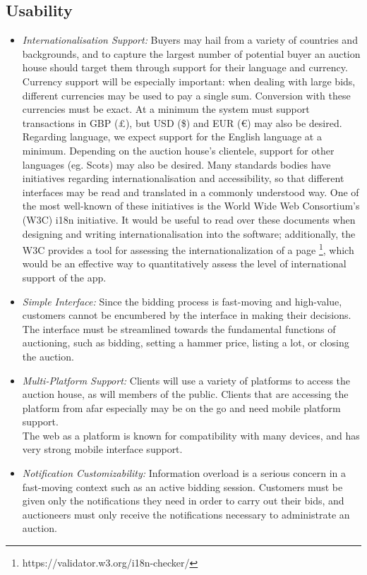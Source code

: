 \documentclass[titlepage, 12pt]{extarticle}
\begin{document}
\subsection{Usability}
\begin{itemize}
\item {\it Internationalisation Support:} Buyers may hail from a variety of countries and backgrounds, and to capture the largest number of potential buyer an auction house should target them through support for their language and currency. Currency support will be especially important: when dealing with large bids, different currencies may be used to pay a single sum. Conversion with these currencies must be exact. At a minimum the system must support transactions in GBP (\pounds), but USD (\$) and EUR (\euro) may also be desired.
\\Regarding language, we expect support for the English language at a minimum. Depending on the auction house's clientele, support for other languages (eg. Scots) may also be desired. Many standards bodies have initiatives regarding internationalisation and accessibility, so that different interfaces may be read and translated in a commonly understood way. One of the most well-known of these initiatives is the World Wide Web Consortium's (W3C) i18n initiative. It would be useful to read over these documents when designing and writing internationalisation into the software; additionally, the W3C provides a tool for assessing the internationalization of a page \footnote{https://validator.w3.org/i18n-checker/}, which would be an effective way to quantitatively assess the level of international support of the app.
\item {\it Simple Interface:} Since the bidding process is fast-moving and high-value, customers cannot be encumbered by the interface in making their decisions. The interface must be streamlined towards the fundamental functions of auctioning, such as bidding, setting a hammer price, listing a lot, or closing the auction.
\item {\it Multi-Platform Support:} Clients will use a variety of platforms to access the auction house, as will members of the public. Clients that are accessing the platform from afar especially may be on the go and need mobile platform support.
\\The web as a platform is known for compatibility with many devices, and has very strong mobile interface support.
\item {\it Notification Customizability:} Information overload is a serious concern in a fast-moving context such as an active bidding session. Customers must be given only the notifications they need in order to carry out their bids, and auctioneers must only receive the notifications necessary to administrate an auction.
\end{itemize}
\end{document}
